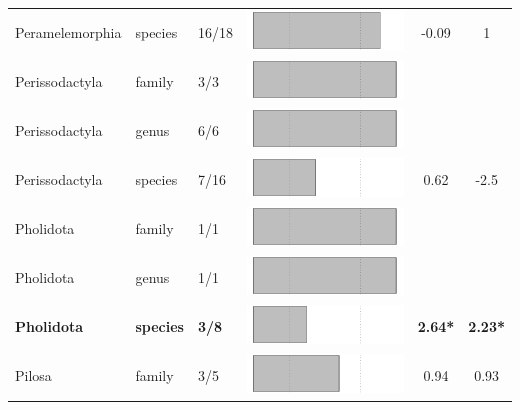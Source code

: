 \begin{longtable}{lL{1.8cm}C{2cm}ccc}
  Peramelemorphia & species & 16/18 & \includegraphics[width=0.20\linewidth, height=0.05\linewidth]{Missing_mammals/Table_figures/bar54.pdf} & -0.09 & 1 \\ 
  Perissodactyla & family & 3/3 & \includegraphics[width=0.20\linewidth, height=0.05\linewidth]{Missing_mammals/Table_figures/bar55.pdf} &   &   \\ 
  Perissodactyla & genus & 6/6 & \includegraphics[width=0.20\linewidth, height=0.05\linewidth]{Missing_mammals/Table_figures/bar56.pdf} &   &   \\ 
  Perissodactyla & species & 7/16 & \includegraphics[width=0.20\linewidth, height=0.05\linewidth]{Missing_mammals/Table_figures/bar57.pdf} & 0.62 & -2.5 \\ 
  Pholidota & family & 1/1 & \includegraphics[width=0.20\linewidth, height=0.05\linewidth]{Missing_mammals/Table_figures/bar58.pdf} &   &   \\ 
  Pholidota & genus & 1/1 & \includegraphics[width=0.20\linewidth, height=0.05\linewidth]{Missing_mammals/Table_figures/bar59.pdf} &   &   \\ 
  \textbf{Pholidota} & \textbf{species} & \textbf{3/8} & \includegraphics[width=0.20\linewidth, height=0.05\linewidth]{Missing_mammals/Table_figures/bar60.pdf} & \textbf{2.64*} & \textbf{2.23*} \\ 
  Pilosa & family & 3/5 & \includegraphics[width=0.20\linewidth, height=0.05\linewidth]{Missing_mammals/Table_figures/bar61.pdf} & 0.94 & 0.93 \\ 

\end{longtable}
